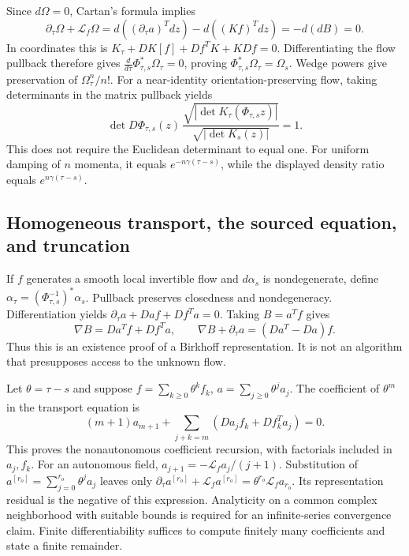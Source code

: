 Since $d\Omega=0$, Cartan's formula implies
\begin{equation}
 \partial_\tau\Omega+\mathcal L_f\Omega
 =d((\partial_\tau a)^Tdz)-d((Kf)^Tdz)
 =-d(dB)=0.
 \label{eq:sup-cartan}
\end{equation}
In coordinates this is $K_\tau+DK[f]+Df^TK+KDf=0$. Differentiating the flow pullback therefore gives
$\frac{d}{d\tau}\Phi_{\tau,s}^*\Omega_\tau=0$, proving $\Phi_{\tau,s}^*\Omega_\tau=\Omega_s$. Wedge powers give preservation of $\Omega_\tau^n/n!$. For a near-identity orientation-preserving flow, taking determinants in the matrix pullback yields
\begin{equation}
 \det D\Phi_{\tau,s}(z)\,
 \frac{\sqrt{|\det K_\tau(\Phi_{\tau,s}z)|}}
      {\sqrt{|\det K_s(z)|}}=1.
 \label{eq:sup-density}
\end{equation}
This does not require the Euclidean determinant to equal one. For uniform damping of $n$ momenta, it equals $e^{-n\gamma(\tau-s)}$, while the displayed density ratio equals $e^{n\gamma(\tau-s)}$.

\subsection{Homogeneous transport, the sourced equation, and truncation}
If $f$ generates a smooth local invertible flow and $d\alpha_s$ is nondegenerate, define $\alpha_\tau=(\Phi_{\tau,s}^{-1})^*\alpha_s$. Pullback preserves closedness and nondegeneracy. Differentiation yields $\partial_\tau a+Da f+Df^Ta=0$. Taking $B=a^Tf$ gives
\begin{equation}
 \nabla B=Da^Tf+Df^Ta,
 \qquad \nabla B+\partial_\tau a=(Da^T-Da)f.
 \label{eq:sup-transport-representation}
\end{equation}
Thus this is an existence proof of a Birkhoff representation. It is not an algorithm that presupposes access to the unknown flow.

Let $\theta=\tau-s$ and suppose $f=\sum_{k\ge0}\theta^kf_k$, $a=\sum_{j\ge0}\theta^ja_j$. The coefficient of $\theta^m$ in the transport equation is
\begin{equation}
 (m+1)a_{m+1}+\sum_{j+k=m}(Da_jf_k+Df_k^Ta_j)=0.
 \label{eq:sup-general-transport}
\end{equation}
This proves the nonautonomous coefficient recursion, with factorials included in $a_j,f_k$. For an autonomous field, $a_{j+1}=-\mathcal L_fa_j/(j+1)$. Substitution of $a^{[r_o]}=\sum_{j=0}^{r_o}\theta^ja_j$ leaves only
$\partial_\tau a^{[r_o]}+\mathcal L_fa^{[r_o]}=\theta^{r_o}\mathcal L_fa_{r_o}$. Its representation residual is the negative of this expression. Analyticity on a common complex neighborhood with suitable bounds is required for an infinite-series convergence claim. Finite differentiability suffices to compute finitely many coefficients and state a finite remainder.

